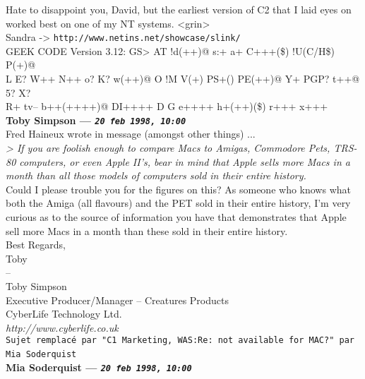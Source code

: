 \documentclass[11pt,twoside,a4paper]{article}
\begin{document}
\begin{multicols*}{2}
Hate to disappoint you, David, but the earliest version of C2 that I laid eyes on worked best on one of my NT systems.  <grin>~\\

Sandra -> \texttt{http://www.netins.net/showcase/slink/}~\\
GEEK CODE Version 3.12: GS> AT !d(++)@ s:+ a+ C+++(\$) !U(C/H\$) P(+)@~\\
L E? W++ N++ o? K? w(++)@ O !M V(+) PS+() PE(++)@ Y+ PGP? t++@ 5? X?~\\
R+ tv-- b++(++++)@ DI++++ D G e++++ h+(++)(\$) r+++ x+++~\\

 
		
	
		
\textbf{Toby Simpson --- \emph{\texttt{20 feb 1998, 10:00}}}~\\

Fred Haineux wrote in message (amongst other things) ...~\\
\emph{> If you are foolish enough to compare Macs to Amigas, Commodore Pets, TRS-80 computers, or even Apple II's, bear in mind that Apple sells more Macs in a month than all those models of computers sold in their entire history.}~\\

Could I please trouble you for the figures on this? As someone who knows what both the Amiga (all flavours) and the PET sold in their entire history, I'm very curious as to the source of information you have that demonstrates that Apple sell more Macs in a month than these sold in their entire history.~\\

Best Regards,~\\
Toby~\\
-- ~\\
Toby Simpson~\\
Executive Producer/Manager -- Creatures Products~\\
CyberLife Technology Ltd.~\\
\emph{http://www.cyberlife.co.uk}~\\

 
		
	
		
\texttt{Sujet remplac{\'e} par "C1 Marketing, WAS:Re: not available for MAC?" par Mia Soderquist}~\\
		
	
		
\textbf{Mia Soderquist --- \emph{\texttt{20 feb 1998, 10:00}}}~\\


\end{multicols*}
\end{document}

